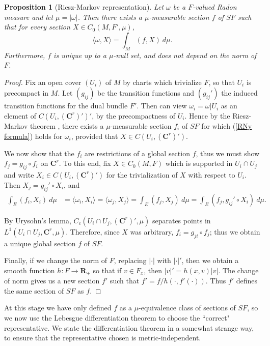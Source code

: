 \documentclass[reqno,12pt,letterpaper]{amsart}
\newcommand{\RR}{\mathbf{R}}
\newcommand{\CC}{\mathbf{C}}
\newtheorem{proposition}[theorem]{Proposition}
\theoremstyle{definition}
\numberwithin{equation}{section}
\begin{document}
\begin{proposition}[Riesz-Markov representation]\label{HanhJordan}
Let $\omega$ be a $F$-valued Radon measure and let $\mu = |\omega|$.
Then there exists a $\mu$-measurable section $f$ of $SF$ such that for every section $X \in C_0(M, F', \mu)$,
\begin{equation}\label{RNy formula}
\langle \omega, X\rangle = \int_M (f, X) ~d\mu.
\end{equation}
Furthermore, $f$ is unique up to a $\mu$-null set, and does not depend on the norm of $F$.
\end{proposition}
\begin{proof}
Fix an open cover $(U_i)$ of $M$ by charts which trivialize $F$, so that $U_i$ is precompact in $M$.
Let $(g_{ij})$ be the transition functions and $(g_{ij}')$ the induced transition functions for the dual bundle $F'$.
Then can view $\omega_i = \omega|U_i$ as an element of $C(U_i, (\CC^r)')'$, by the precompactness of $U_i$.
Hence by the Riesz-Markov theorem \cite[Theorem 4.14]{simon1983GMT}, there exists a $\mu$-measurable section $f_i$ of $SF$ for which (\ref{RNy formula}) holds for $\omega_i$, provided that $X \in C(U_i, (\CC^r)')$.

We now show that the $f_i$ are restrictions of a global section $f$, thus we must show $f_j = g_{ij} \circ f_i$ on $\CC^r$.
To this end, fix $X \in C_0(M, F)$ which is supported in $U_i \cap U_j$ and write $X_i \in C(U_i, (\CC^r)')$ for the trivialization of $X$ with respect to $U_i$.
Then $X_j = g_{ij}' \circ X_i$, and
\begin{align*}
\int_E (f_i, X_i) ~d\mu &= \langle \omega_i, X_i\rangle = \langle \omega_j, X_j\rangle = \int_E (f_j, X_j) ~d\mu = \int_E (f_j, g_{ij}' \circ X_i) ~d\mu.
\end{align*}

By Urysohn's lemma, $C_c(U_i \cap U_j, (\CC^r)', \mu)$ separates points in $L^1(U_i \cap U_j, \CC^r, \mu)$.
Therefore, since $X$ was arbitrary, $f_i = g_{ji} \circ f_j$; thus we obtain a unique global section $f$ of $SF$.

Finally, if we change the norm of $F$, replacing $|\cdot|$ with $|\cdot|'$, then we obtain a smooth function $h: F \to \RR_+$ so that if $v \in F_x$, then $|v|' = h(x, v)|v|$.
The change of norm gives us a new section $f'$ such that $f' = f/h(\cdot, f'(\cdot))$.
Thus $f'$ defines the same section of $SF$ as $f$.
\end{proof}

At this stage we have only defined $f$ as a $\mu$-equivalence class of sections of $SF$, so we now use the Lebesgue differentiation theorem to choose the ``correct" representative.
We state the differentiation theorem in a somewhat strange way, to ensure that the representative chosen is metric-independent.
\end{document}
